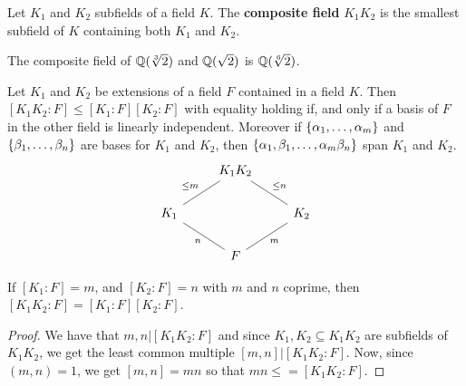 \begin{definition}
     Let $K_1$ and $K_2$ subfields of a field $K$. The  \textbf{composite field}
     $K_1K_2$ is the smallest subfield of $K$ containing both  $K_1$ and $K_2$.
 \end{definition}

 \begin{example}\label{example_1.10}
     The composite field of $\mathbb{Q}(\sqrt[3]{2})$ and $\mathbb{Q}(\sqrt{2})$ is
     $\mathbb{Q}(\sqrt[6]{2})$.
 \end{example}

 \begin{lemma}\label{1.2.8}
     Let $K_1$ and $K_2$ be extensions of a field $F$ contained in a field  $K$.
     Then  $[K_1K_2:F] \leq [K_1:F][K_2:F]$ with equality holding if, and only
     if a basis of $F$ in the other field is linearly independent. Moreover if
     $\{\alpha_1, \dots, \alpha_m\}$ and $\{\beta_1, \dots, \beta_n\}$ are bases for $K_1$ and
     $K_2$, then $\{\alpha_1,\beta_1, \dots, \alpha_m\beta_n\}$ span $K_1$ and $K_2$.
     \[\begin{tikzcd}
        & {K_1K_2} \\
        K_1 && K_2 \\
        & F
        \arrow["{\leq m}"', no head, from=1-2, to=2-1]
        \arrow["n"', no head, from=2-1, to=3-2]
        \arrow["m"', no head, from=3-2, to=2-3]
        \arrow["{\leq n}"', no head, from=2-3,to=1-2]
      \end{tikzcd}\]
 \end{lemma}
 \begin{corollary}
     If $[K_1:F]=m$, and $[K_2:F]=n$ with $m$ and  $n$ coprime, then
     $[K_1K_2:F]=[K_1:F][K_2:F]$.
 \end{corollary}
 \begin{proof}
     We have that $m,n|[K_1K_2:F]$ and since $K_1,K_2 \subseteq K_1K_2$ are
     subfields of $K_1K_2$, we get the least common multiple $[m,n]|[K_1K_2:F]$.
     Now, since $(m,n)=1$, we get $[m,n]=mn$ so that $mn \leq =[K_1K_2:F]$.
 \end{proof}

